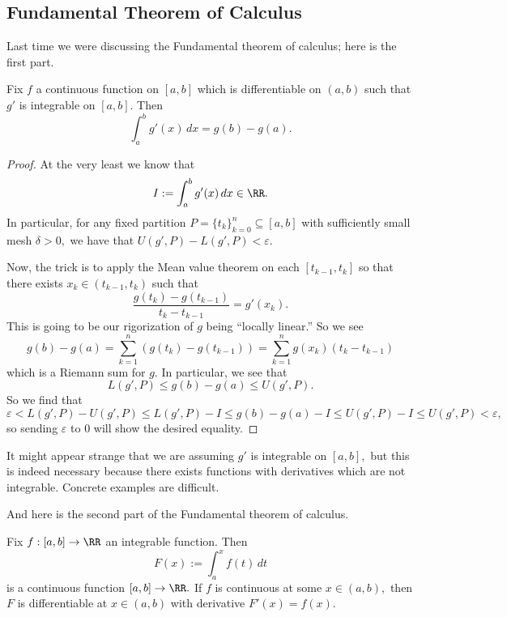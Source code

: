 













\subsection{Fundamental Theorem of Calculus}
Last time we were discussing the Fundamental theorem of calculus; here is the first part.
\begin{theorem}
	Fix $f$ a continuous function on $[a,b]$ which is differentiable on $(a,b)$ such that $g'$ is integrable on $[a,b].$ Then
	\[\int_a^bg'(x)\,dx=g(b)-g(a).\]
\end{theorem}
\begin{proof}
	At the very least we know that
	\[I:=\int_a^bg'(x)\,dx\in\RR.\]
	In particular, for any fixed partition $P=\{t_k\}_{k=0}^n\subseteq[a,b]$ with sufficiently small mesh $\delta>0,$ we have that $U(g',P)-L(g',P)<\varepsilon.$
	
	Now, the trick is to apply the Mean value theorem on each $[t_{k-1},t_k]$ so that there exists $x_k\in(t_{k-1},t_k)$ such that
	\[\frac{g(t_k)-g(t_{k-1})}{t_k-t_{k-1}}=g'(x_k).\]
	This is going to be our rigorization of $g$ being ``locally linear.'' So we see
	\[g(b)-g(a)=\sum_{k=1}^n(g(t_k)-g(t_{k-1}))=\sum_{k=1}^ng(x_k)(t_k-t_{k-1})\]
	which is a Riemann sum for $g.$ In particular, we see that
	\[L(g',P)\le g(b)-g(a)\le U(g',P).\]
	So we find that
	\[\varepsilon<L(g',P)-U(g',P)\le L(g',P)-I\le g(b)-g(a)-I\le U(g',P)-I\le U(g',P)<\varepsilon,\]
	so sending $\varepsilon$ to $0$ will show the desired equality.
\end{proof}
\begin{remark}
	It might appear strange that we are assuming $g'$ is integrable on $[a,b],$ but this is indeed necessary because there exists functions with derivatives which are not integrable. Concrete examples are difficult.
\end{remark}
And here is the second part of the Fundamental theorem of calculus.
\begin{theorem}
	Fix $f:[a,b]\to\RR$ an integrable function. Then
	\[F(x):=\int_a^xf(t)\,dt\]
	is a continuous function $[a,b]\to\RR.$ If $f$ is continuous at some $x\in(a,b),$ then $F$ is differentiable at $x\in(a,b)$ with derivative $F'(x)=f(x).$
\end{theorem}
